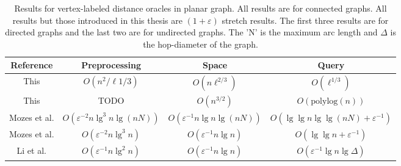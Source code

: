 \begin{table}[h!]
  \centering
  \begin{adjustbox}{width=1\textwidth}
  \small
  \begin{tabular}{c | c | c | c}
    Reference & Preprocessing & Space & Query \\
    \hline\hline
    This & $O(n^2/\ell{1/3})$ & $O(n\ell^{2/3})$ & $O(\ell^{1/3})$ \\
    \hline
    This & TODO & $O(n^{3/2})$ & $O(\text{polylog}(n))$ \\
    \hline
    Mozes et al. \cite{mozes2015efficient} &
    $O(\varepsilon^{-2}n\lg^3 n\lg (nN))$ & $O(\varepsilon^{-1}n\lg n \lg(nN))$ & $O(\lg
    \lg n \lg \lg (nN) + \varepsilon^{-1})$ \\
    \hline
    Mozes et al. \cite{mozes2015efficient} & $O(\varepsilon^{-2}n\lg^3 n)$ & $O(\varepsilon^{-1}n\lg n)$ &
    $O(\lg \lg n + \varepsilon^{-1})$ \\
    \hline
    Li et al. \cite{li20131+} & $O(\varepsilon^{-1}n\lg^2 n)$ & $O(\varepsilon^{-1}n\lg n)$ & $O(\varepsilon^{-1}\lg
    n \lg \Delta)$
  \end{tabular}
\end{adjustbox}
  \caption{Results for vertex-labeled distance oracles in planar graph. All results are
  for connected graphs. All results but those introduced in this thesis are
$(1+\varepsilon)$ stretch results. The first three results are for directed graphs and
the last two are for undirected graphs. The 'N' is the maximum arc length and $\Delta$ is the hop-diameter
of the graph.}
  \label{vertexresults}
\end{table}

